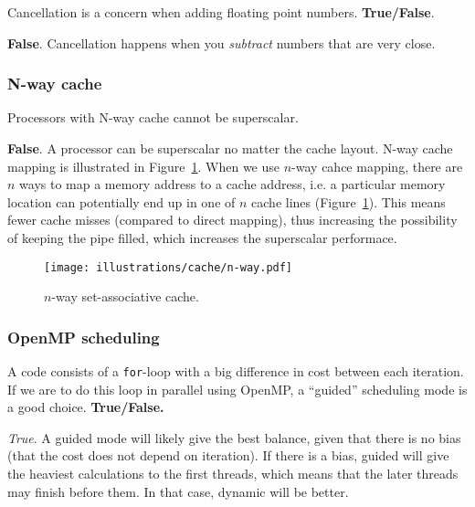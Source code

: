 \begin{question}
  Cancellation is a concern when adding floating point numbers. \textbf{True/False}.
\end{question}

\textbf{False}. Cancellation happens when you \emph{subtract} numbers that are very close.

\subsubsection{N-way cache} %
\label{ssub:n_way_cache}


\begin{question}
  Processors with N-way cache cannot be superscalar.
\end{question}
\textbf{False}. A processor can be superscalar no matter the cache layout. N-way cache mapping is illustrated in Figure~\ref{fig:nway}. When we use $n$-way cahce mapping, there are $n$ ways to map a memory address to a cache address, i.e. a particular memory location can potentially end up in one of $n$ cache lines (Figure~\ref{fig:nway}). This means fewer cache misses (compared to direct mapping), thus increasing the possibility of keeping the pipe filled, which increases the superscalar performace.

\begin{figure}[htbp]
  \centering
  \texttt{[image: illustrations/cache/n-way.pdf]}
  \caption{$n$-way set-associative cache.}
  \label{fig:nway}
\end{figure}

\subsubsection{OpenMP scheduling} %
\label{ssub:openmp_scheduling}


\begin{question}
  A code consists of a \texttt{for}-loop with a big difference in cost between each iteration. If we are to do this loop in parallel using OpenMP, a ``guided'' scheduling mode is a good choice. \textbf{True/False.}
\end{question}

\emph{True}. A guided mode will likely give the best balance, given that there is no bias (that the cost does not depend on iteration). If there is a bias, guided will give the heaviest calculations to the first threads, which means that the later threads may finish before them. In that case, dynamic will be better.

